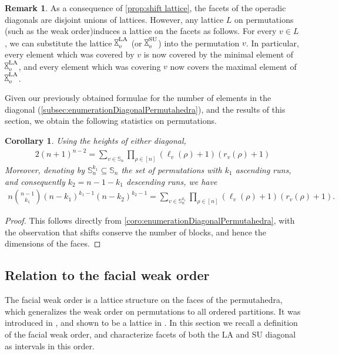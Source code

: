 \documentclass{amsart}
\newtheorem{corollary}[theorem]{Corollary}
\theoremstyle{definition}
\newtheorem{remark}[theorem]{Remark}
\newcommand{\SU}{\mathrm{SU}}
\newcommand{\LA}{\mathrm{LA}}
\newcommand{\hour}{\raisebox{0.065cm}{\rotatebox[origin=c]{90}{$\bowtie$}}_v}
\begin{document}
\begin{remark}
As a consequence of \cref{prop:shift lattice}, the facets of the operadic diagonals are disjoint unions of lattices.
However, any lattice $L$ on permutations (such as the weak order)induces a lattice on the facets as follows.
For every $v \in L$, we can substitute the lattice $\hour^\LA$ (or $\hour^\SU$) into the permutation $v$.
In particular, every element which was covered by $v$ is now covered by the minimal element of $\hour^\LA$, and every element which was covering $v$ now covers the maximal element of $\hour^\LA$.
\end{remark}

Given our previously obtained formulae for the number of elements in the diagonal (\cref{subsec:enumerationDiagonalPermutahedra}), and the results of this section, we obtain the following statistics on permutations.

\begin{corollary}
Using the heights of either diagonal,
\begin{align*}
2(n+1)^{n-2} = \sum_{v \in \mathbb{S}_n} \prod_{\rho \in [n]} (\ell_v(\rho)+1)(r_v(\rho)+1)
\end{align*}
Moreover, denoting by $\mathbb{S}_n^{k_1} \subseteq \mathbb{S}_n$ the set of permutations with $k_1$ ascending runs, and consequently $k_2 = n-1-k_1$ descending runs, we have 
\begin{align*}
n \binom{n-1}{k_1} (n-k_1)^{k_1-1} (n-k_2)^{k_2-1} = \sum_{v \in \mathbb{S}_n^{k_1}} \prod_{\rho \in [n]} (\ell_v(\rho)+1)(r_v(\rho)+1).
\end{align*}
\end{corollary}

\begin{proof}
This follows directly from \cref{coro:enumerationDiagonalPermutahedra}, with the observation that shifts conserve the number of blocks, and hence the dimensions of the faces.
\end{proof}




\subsection{Relation to the facial weak order}
\label{sec:facial-weak-order}

The facial weak order is a lattice structure on the faces of the permutahedra, which generalizes the weak order on permutations to all ordered partitions.
It was introduced in \cite{palacios2004weak}, and shown to be a lattice in \cite{dermenjian2018facial}.
In this section we recall a definition of the facial weak order, and characterize facets of both the $\LA$ and $\SU$ diagonal as intervals in this order.
\end{document}

